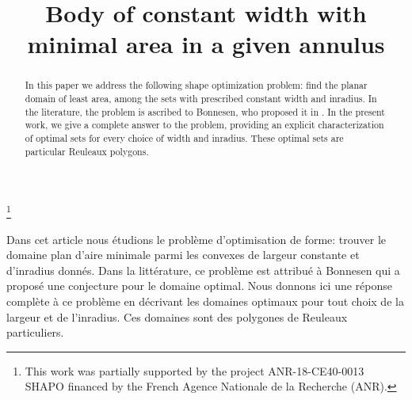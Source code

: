 \documentclass[JEP,XML,SOM,Unicode,NoFloatCountersInSection]{cedram}
\theoremstyle{plain}
\theoremstyle{definition}
\begin{document}
\frontmatter
\title[Body of constant width with minimal area in a given annulus]{Body of constant width with minimal area in a given annulus}

\author[\initial{A.} \lastname{Henrot}]{ }
\address{Université de Lorraine CNRS, IECL\\
F-54000 Nancy, France}

\author[\initial{I.} \lastname{Lucardesi}]{ }
\address{Université de Lorraine CNRS, IECL\\
F-54000 Nancy, France}

\thanks{This work was partially supported by the project ANR-18-CE40-0013 SHAPO financed by the French Agence Nationale de la Recherche (ANR).}

\begin{abstract}
In this paper we address the following shape optimization problem: find the planar domain of least area, among the sets with prescribed constant width and inradius. In the literature, the problem is ascribed to Bonnesen, who proposed it in . In the present work, we give a complete answer to the problem, providing an explicit characterization of optimal sets for every choice of width and inradius. These optimal sets are particular Reuleaux polygons.
\end{abstract}





\begin{altabstract}
Dans cet article nous étudions le problème d'optimisation de forme: trouver le domaine plan d'aire minimale parmi les convexes de largeur constante et d'inradius donnés. Dans la littérature, ce problème est attribué à Bonnesen qui a proposé une conjecture pour le domaine optimal. Nous donnons ici une réponse complète à ce problème en décrivant les domaines optimaux pour tout choix de la largeur et de l'inradius. Ces domaines sont des polygones de Reuleaux particuliers.\end{altabstract}
\end{document}
